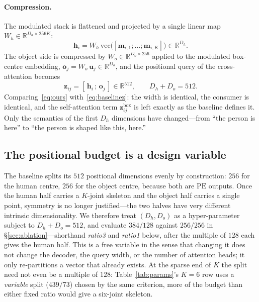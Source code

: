 \documentclass[12pt,a4paper]{article}
\newcommand{\bz}{\mathbf{z}}
\newcommand{\PE}{\mathrm{PE}}
\newcommand{\R}{\mathbb{R}}
\begin{document}
\paragraph{Compression.} The modulated stack is flattened and projected by a
single linear map $W_h \in \R^{D_h \times 256K}$:
\begin{equation}
\mathbf{h}_i = W_h \,\mathrm{vec}\big([\mathbf{m}_{i,1}; \dots; \mathbf{m}_{i,K}]\big)
\in \R^{D_h}.
\end{equation}
The object side is compressed by $W_o \in \R^{D_o \times 256}$ applied to the
modulated box-centre embedding,
$\mathbf{o}_j = W_o\, \mathbf{u}_j \in \R^{D_o}$, and the positional query of
the cross-attention becomes
\begin{equation}
\boxed{\;\bz_{ij} = [\,\mathbf{h}_i \,;\, \mathbf{o}_j\,] \in \R^{512},
\qquad D_h + D_o = 512 .\;}
\label{eq:ours}
\end{equation}
Comparing~\eqref{eq:ours} with~\eqref{eq:baselinez}: the width is identical, the
consumer is identical, and the self-attention term $\bz^{\text{box}}_{ij}$ is
left exactly as the baseline defines it. Only the semantics of the first
$D_h$ dimensions have changed---from ``the person is here'' to ``the person is
shaped like this, here.''

\subsection{The positional budget is a design variable}
\label{sec:budget}

The baseline splits its $512$ positional dimensions evenly by construction:
$256$ for the human centre, $256$ for the object centre, because both are
$\PE$ outputs. Once the human half carries a $K$-joint skeleton and the object
half carries a single point, symmetry is no longer justified---the two halves
have very different intrinsic dimensionality. We therefore treat $(D_h, D_o)$
as a hyper-parameter subject to $D_h + D_o = 512$, and evaluate $384/128$
against $256/256$ in \S\ref{sec:ablation}---shorthand \emph{ratio3} and
\emph{ratio1} below, after the multiple of $128$ each gives the human half.
This is a free variable in the sense that changing it does not change the
decoder, the query width, or the number of attention heads; it only
re-partitions a vector that already exists. At the sparse end of $K$ the split
need not even be a multiple of $128$: Table~\ref{tab:params}'s $K{=}6$ row uses
a \emph{variable} split ($439/73$) chosen by the same criterion, more of the
budget than either fixed ratio would give a six-joint skeleton.
\end{document}
